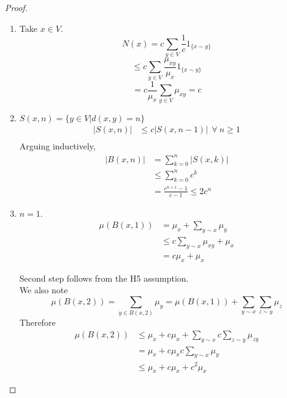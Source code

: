 \documentclass[main]{subfiles}
\begin{document}
\begin{proof}
  \begin{enumerate}
    \item Take $x \in V$.
          $$N(x)= c \sum_{y \in V} \frac{1}{c} 1_{\{x \sim y\}}$$
          $$\leq c \sum_{y \in V} \frac{\mu_{xy}}{\mu_x} 1_{\{x \sim y\}}$$
          $$=c \frac{1}{\mu_x} \sum_{y \in V} \mu_{xy}=c$$
    \item $S(x,n)=\{y \in V |d(x,y)=n\}$
          \begin{align*}
            |S(x,n) | & \leq c |S(x,n-1)| ~~\forall~ n \geq 1 \\
          \end{align*}
          Arguing inductively,
          \begin{align*}
            |B(x,n)| & = \sum_{k=0}^n |S(x,k)|           \\
                     & \leq \sum_{k=0}^n c^k             \\
                     & = \frac{c^{n+1}-1}{c-1} \leq 2c^n
          \end{align*}
    \item $n=1$. \begin{align*}
            \mu(B(x,1)) & =\mu_x +\sum_{y \sim x} \mu_y          \\
                        & \leq c \sum_{y \sim x} \mu_{xy} +\mu_x \\
                        & = c \mu_x +\mu_x
          \end{align*}

          Second step follows from the H5 assumption. \\
          We also note
          $$\mu (B(x,2))= \sum_{y \in B(x,2)} \mu_y =\mu (B(x,1))+ \sum_{y \sim x} \sum_{z \sim y} \mu_z$$
          Therefore
          \begin{align*}
            \mu (B(x,2)) & \leq \mu_x + c \mu_x +\sum_{y \sim x} c \sum_{z \sim y} \mu_{zy} \\
                         & = \mu_x +c \mu_x c \sum_{y \sim x} \mu_y                         \\
                         & \leq \mu_x +c \mu_x +c^2 \mu_x
          \end{align*}
  \end{enumerate}
\end{proof}
\end{document}
